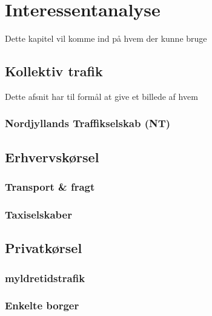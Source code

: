 
\chapter{Interessentanalyse}

Dette kapitel vil komme ind på hvem der kunne bruge 

\section{Kollektiv trafik}

Dette afsnit har til formål at give et billede af hvem

\subsection{Nordjyllands Traffikselskab (NT)}



\section{Erhvervskørsel}



\subsection{Transport & fragt}



\subsection{Taxiselskaber}



\section{Privatkørsel}



\subsection{myldretidstrafik}



\subsection{Enkelte borger}



